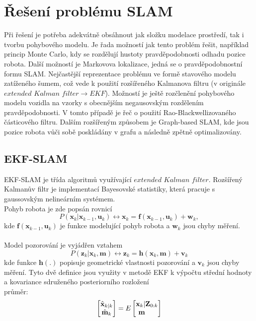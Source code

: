\documentclass[12pt]{report}
\begin{document}
\newpage
\section{Řešení problému SLAM}
Při řešení je potřeba adekvátně obsáhnout jak složku modelace prostředí, tak i tvorbu pohybového modelu.
Je řada možností jak tento problém řešit, například princip Monte Carlo, kdy se rozdělují hustoty pravděpodobnosti odhadu pozice robota. Další možností je Markovova lokalizace, jedná se o pravděpodobnostní formu SLAM. Nejčastější reprezentace problému ve formě stavového modelu zatíženého šumem, což vede k použití rozšířeného Kalmanova filtru (v originále $extended$ $Kalman$ $filter\rightarrow EKF$). Možností je ještě rozčlenění pohybového modelu vozidla na vzorky s obecnějším negausovským rozdělením pravděpodobnosti. V tomto případě je řeč o použití Rao-Blackwellizovaného částicového filtru. Dalším rozšířeným způsobem je Graph-based SLAM, kde jsou pozice robota vůči sobě poskládány v grafu a následně zpětně optimalizovány. 
\\
\subsection{EKF-SLAM}
EKF-SLAM je třída algoritmů využívající $extended$ $Kalman$ $filter$. Rozšířený Kalmanův filtr je implementací Bayesovské statistiky, která pracuje s gaussovským nelineárním systémem. \\
Pohyb robota je zde popsán rovnicí
\begin{equation}
	P(\textbf{x}_k|\textbf{x}_{k-1},\textbf{u}_k)\leftrightarrow \textbf{x}_k=\textbf{f}(\textbf{x}_{k-1},\textbf{u}_k)+\textbf{w}_k,
\end{equation} 
kde $\textbf{f}(\textbf{x}_{k-1},\textbf{u}_k)$ je funkce modelující pohyb robota a $\textbf{w}_k$ jsou chyby měření.\\
\\
Model pozorování je vyjádřen vztahem
\begin{equation}
	P(\textbf{z}_k|\textbf{x}_k,\textbf{m})\leftrightarrow \textbf{z}_k=\textbf{h}(\textbf{x}_k,\textbf{m})+\textbf{v}_k
\end{equation}
kde funkce $\textbf{h}(.)$ popisuje geometrické vlastnosti pozorování a $\textbf{v}_k$ jsou chyby měření.
Tyto dvě definice jsou využity v metodě EKF k výpočtu střední hodnoty a kovariance sdruženého posteriorního rozložení\\
\indent průměr:
\begin{equation}
	\begin{bmatrix}
	\hat{\textbf{x}}_{k|k}\\\hat{\textbf{m}}_k
	\end{bmatrix}=E
	\begin{bmatrix}
	\textbf{x}_k |\textbf{Z}_{0:k}\\\textbf{m}\indent
	\end{bmatrix}
\end{equation}
\end{document}
